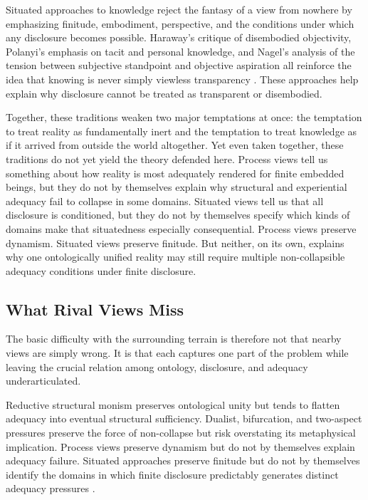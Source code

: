 \documentclass[11pt]{article}
\begin{document}
Situated approaches to knowledge reject the fantasy of a view from nowhere by emphasizing finitude, embodiment, perspective, and the conditions under which any disclosure becomes possible. Haraway's critique of disembodied objectivity, Polanyi's emphasis on tacit and personal knowledge, and Nagel's analysis of the tension between subjective standpoint and objective aspiration all reinforce the idea that knowing is never simply viewless transparency \cite{Haraway1988,Polanyi1958,Nagel1986}. These approaches help explain why disclosure cannot be treated as transparent or disembodied.

Together, these traditions weaken two major temptations at once: the temptation to treat reality as fundamentally inert and the temptation to treat knowledge as if it arrived from outside the world altogether. Yet even taken together, these traditions do not yet yield the theory defended here. Process views tell us something about how reality is most adequately rendered for finite embedded beings, but they do not by themselves explain why structural and experiential adequacy fail to collapse in some domains. Situated views tell us that all disclosure is conditioned, but they do not by themselves specify which kinds of domains make that situatedness especially consequential. Process views preserve dynamism. Situated views preserve finitude. But neither, on its own, explains why one ontologically unified reality may still require multiple non-collapsible adequacy conditions under finite disclosure.

\subsection{What Rival Views Miss}

The basic difficulty with the surrounding terrain is therefore not that nearby views are simply wrong. It is that each captures one part of the problem while leaving the crucial relation among ontology, disclosure, and adequacy underarticulated.

Reductive structural monism preserves ontological unity but tends to flatten adequacy into eventual structural sufficiency. Dualist, bifurcation, and two-aspect pressures preserve the force of non-collapse but risk overstating its metaphysical implication. Process views preserve dynamism but do not by themselves explain adequacy failure. Situated approaches preserve finitude but do not by themselves identify the domains in which finite disclosure predictably generates distinct adequacy pressures \cite{Whitehead1978,Rescher1996,Haraway1988,Nagel1974,Levine1983}.
\end{document}
